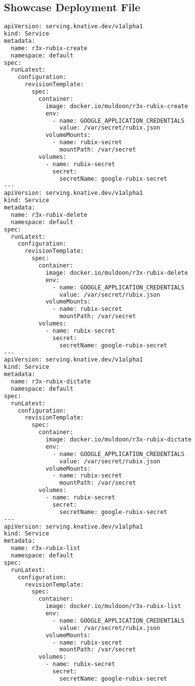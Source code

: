 \documentclass{article}
\begin{document}
\subsection{Showcase Deployment File}
\label{appendix:deploy}
\begin{lstlisting}[language=bash]
apiVersion: serving.knative.dev/v1alpha1
kind: Service
metadata:
  name: r3x-rubix-create
  namespace: default
spec:
  runLatest:
    configuration:
      revisionTemplate:
        spec:
          container:
            image: docker.io/muldoon/r3x-rubix-create
            env:
              - name: GOOGLE_APPLICATION_CREDENTIALS
                value: /var/secret/rubix.json
            volumeMounts:
              - name: rubix-secret
                mountPath: /var/secret
          volumes:
            - name: rubix-secret
              secret:
                secretName: google-rubix-secret
---
apiVersion: serving.knative.dev/v1alpha1
kind: Service
metadata:
  name: r3x-rubix-delete
  namespace: default
spec:
  runLatest:
    configuration:
      revisionTemplate:
        spec:
          container:
            image: docker.io/muldoon/r3x-rubix-delete
            env:
              - name: GOOGLE_APPLICATION_CREDENTIALS
                value: /var/secret/rubix.json
            volumeMounts:
              - name: rubix-secret
                mountPath: /var/secret
          volumes:
            - name: rubix-secret
              secret:
                secretName: google-rubix-secret
---
apiVersion: serving.knative.dev/v1alpha1
kind: Service
metadata:
  name: r3x-rubix-dictate
  namespace: default
spec:
  runLatest:
    configuration:
      revisionTemplate:
        spec:
          container:
            image: docker.io/muldoon/r3x-rubix-dictate
            env:
              - name: GOOGLE_APPLICATION_CREDENTIALS
                value: /var/secret/rubix.json
            volumeMounts:
              - name: rubix-secret
                mountPath: /var/secret
          volumes:
            - name: rubix-secret
              secret:
                secretName: google-rubix-secret
---
apiVersion: serving.knative.dev/v1alpha1
kind: Service
metadata:
  name: r3x-rubix-list
  namespace: default
spec:
  runLatest:
    configuration:
      revisionTemplate:
        spec:
          container:
            image: docker.io/muldoon/r3x-rubix-list
            env:
              - name: GOOGLE_APPLICATION_CREDENTIALS
                value: /var/secret/rubix.json
            volumeMounts:
              - name: rubix-secret
                mountPath: /var/secret
          volumes:
            - name: rubix-secret
              secret:
                secretName: google-rubix-secret
\end{lstlisting}
\end{document}
